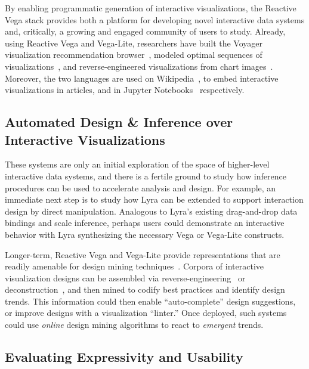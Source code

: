 By enabling programmatic generation of interactive visualizations, the Reactive
Vega stack provides both a platform for developing novel interactive data
systems and, critically, a growing and engaged community of users to study.
Already, using Reactive Vega and Vega-Lite, researchers have built the Voyager
visualization recommendation browser~\cite{voyager,voyager2,compassql}, modeled
optimal sequences of visualizations~\cite{kim:graphscape}, and
reverse-engineered visualizations from chart images~\cite{poco:reverse}.
Moreover, the two languages are used on Wikipedia~\cite{mediawiki:graph}, to
embed interactive visualizations in articles, and in Jupyter
Notebooks~\cite{vega-lite:altair} respectively.

\vspace{-10pt}

\subsection{Automated Design \& Inference over Interactive Visualizations}

\vspace{-7pt}

These systems are only an initial exploration of the space of higher-level
interactive data systems, and there is a fertile ground to study how inference
procedures can be used to accelerate analysis and design. For example, an
immediate next step is to study how Lyra can be extended to support interaction
design by direct manipulation. Analogous to Lyra's existing drag-and-drop data
bindings and scale inference, perhaps users could demonstrate an interactive
behavior with Lyra synthesizing the necessary Vega or Vega-Lite constructs.

Longer-term, Reactive Vega and Vega-Lite provide representations that are
readily amenable for design mining techniques~\cite{kumar:webzeitgeist}. Corpora
of interactive visualization designs can be assembled via
reverse-engineering~\cite{poco:reverse} or
deconstruction~\cite{harper:deconstructing,harper:templates}, and then mined to
codify best practices and identify design trends. This information could then
enable ``auto-complete'' design suggestions, or improve designs with a
visualization ``linter.'' Once deployed, such systems could use \emph{online}
design mining algorithms to react to \emph{emergent} trends.

\vspace{-10pt}

\subsection{Evaluating Expressivity and Usability}

